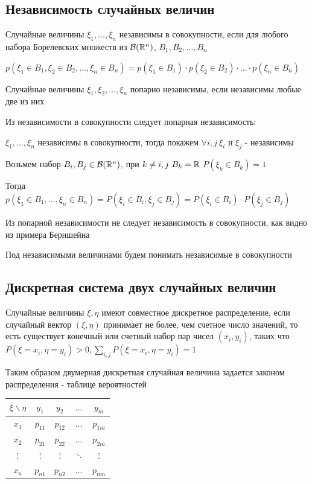 \documentclass[12pt]{article}
\begin{document}
    \subsection{Независимость случайных величин}

    \Def Случайные величины $\xi_1, \dots, \xi_n$ независимы в совокупности, если для любого набора Борелевских множеств из
    $\mathcal{B}(\mathbb{R}^n)$, $B_1, B_2, \dots, B_n$

    $p(\xi_1 \in B_1, \xi_2 \in B_2, \dots, \xi_n \in B_n) = p(\xi_1 \in B_1) \cdot p(\xi_2 \in B_2) \cdot \dots \cdot p(\xi_n \in B_n)$

    \Def Случайные величины $\xi_1, \xi_2, \dots, \xi_n$ попарно независимы, если независимы любые две из них

    \Notas Из независимости в совокупности следует попарная независимость: 

    $\xi_1, \dots, \xi_n$ независимы в совокупности, тогда покажем $\forall i, j \ \xi_i$ и $\xi_j$ - независимы

    Возьмем набор $B_i, B_j \in \mathcal{B}(\mathbb{R}^n)$, при $k \neq i, j \ B_k = \mathbb{R}$ \hfill $P(\xi_k \in B_k) = 1$

    Тогда $p(\xi_1 \in B_1, \dots, \xi_n \in B_n) = P(\xi_i \in B_i, \xi_j \in B_j) = P(\xi_i \in B_i) \cdot P(\xi_j \in B_j)$

    \Nota Из попарной независимости не следует независимость в совокупности, как видно из примера Берншейна

    Под независимыми величинами будем понимать независимые в совокупности

    \subsection{Дискретная система двух случайных величин}

    \Def Случайные величины $\xi, \eta$ имеют совместное дискретное распределение, если случайный вектор $(\xi, \eta)$
    принимает не более, чем счетное число значений, то есть существует конечный или счетный набор пар чисел $(x_i, y_i)$, 
    таких что $P(\xi = x_i, \eta = y_i) > 0, \sum_{i, j} P(\xi = x_i, \eta = y_i) = 1$

    Таким образом двумерная дискретная случайная величина задается законом распределения - таблице вероятностей

    \begin{tabular}{c|c|c|c|c}
        $\xi \backslash \eta$ & $y_1$ & $y_2$ & $\dots$ & $y_m$ \\
        \hline
        $x_1$ & $p_{11}$ & $p_{12}$ & $\dots$ & $p_{1m}$ \\
        \hline
        $x_2$ & $p_{21}$ & $p_{22}$ & $\dots$ & $p_{2m}$ \\
        \hline
        $\vdots$ & $\vdots$ & $\vdots$ & $\ddots$ & $\vdots$ \\
        \hline
        $x_n$ & $p_{n1}$ & $p_{n2}$ & $\dots$ & $p_{nm}$ \\
    \end{tabular}
\end{document}
